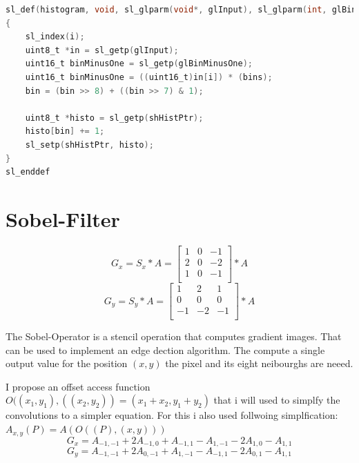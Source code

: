 \documentclass[a4paper,fontsize=12pt]{scrartcl}
\begin{document}
\begin{lstlisting}[language=C]
sl_def(histogram, void, sl_glparm(void*, glInput), sl_glparm(int, glBinMinusOne), sl_shparm(void*, shHistPtr))
{
	sl_index(i);
	uint8_t *in = sl_getp(glInput);
	uint16_t binMinusOne = sl_getp(glBinMinusOne);
	uint16_t binMinusOne = ((uint16_t)in[i]) * (bins);
	bin = (bin >> 8) + ((bin >> 7) & 1);
	
	uint8_t *histo = sl_getp(shHistPtr);
	histo[bin] += 1;
	sl_setp(shHistPtr, histo);
}
sl_enddef
\end{lstlisting}

\section{Sobel-Filter}

\begin{equation*}
G_x = S_x*A = \begin{bmatrix}
1 & 0 & -1 \\
2 & 0 & -2 \\
1 & 0 & -1 \\
\end{bmatrix} * A
\end{equation*}
\begin{equation*}
G_y = S_y*A = \begin{bmatrix}
1 & 2 & 1 \\
0 & 0 & 0 \\
-1 & -2 & -1 \\
\end{bmatrix} * A
\end{equation*}

The Sobel-Operator is a stencil operation that computes gradient images. That can be used to implement an edge dection algorithm. The compute a single output value for the position $(x,y)$ the pixel and its eight neibourghs are neeed.

I propose an offset access function $O((x_1,y_1),((x_2,y_2)) = (x_1+x_2,y_1+y_2)$ that i will used to simplfy the convolutions to a simpler equation. For this i also used follwoing simplfication: $A_{x,y}(P) = A(O((P),(x,y)))$
\begin{equation*}
G_x = A_{-1,-1} + 2 A_{-1,0} +  A_{-1,1} -  A_{1,-1} - 2 A_{1,0} -  A_{1,1}
\end{equation*}
\begin{equation*}
G_y = A_{-1,-1} + 2 A_{0,-1} +  A_{1,-1} -  A_{-1,1} - 2 A_{0,1} -  A_{1,1}
\end{equation*}
\end{document}

